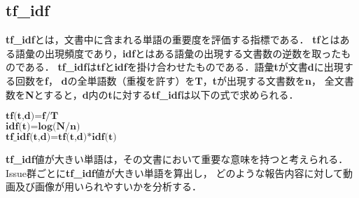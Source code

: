 \subsection{\textbf{tf\_idf}}
\textbf{tf\_idf}とは，文書中に含まれる単語の重要度を評価する指標である．
\textbf{tf}とはある語彙の出現頻度であり，\textbf{idf}とはある語彙の出現する文書数の逆数を取ったものである．
\textbf{tf\_idf}は\textbf{tf}と\textbf{idf}を掛け合わせたものである．語彙\textbf{t}が文書\textbf{d}に出現する回数を\textbf{f}，
\textbf{d}の全単語数（重複を許す）を\textbf{T}，\textbf{t}が出現する文書数を\textbf{n}，
全文書数を\textbf{N}とすると，\textbf{d}内の\textbf{t}に対する\textbf{tf\_idf}は以下の式で求められる．
\begin{center}
  $\textbf{tf(t,d)=f/T}$ \\
  $\textbf{idf(t)=log(N/n)}$ \\
  $\textbf{tf\_idf(t,d)=tf(t,d)*idf(t)}$
\end{center}

\textbf{tf\_idf}値が大きい単語は，その文書において重要な意味を持つと考えられる．
Issue群ごとに\textbf{tf\_idf}値が大きい単語を算出し，
どのような報告内容に対して動画及び画像が用いられやすいかを分析する．
